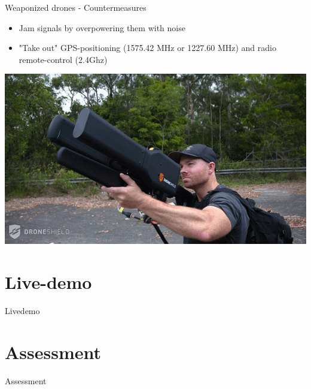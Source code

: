 \documentclass[aspectratio=169]{beamer}
\begin{document}
\begin{frame}{Weaponized drones - Countermeasures}
	\begin{itemize}
		\item Jam signals by overpowering them with noise
		\item "Take out" GPS-positioning (1575.42 MHz or 1227.60 MHz) and radio remote-control (2.4Ghz)
	\end{itemize}

\centering
\includegraphics[width=.6\textwidth]{images/drone_jammer.jpg}

\tiny{\color{gray}{http://www.dailymail.co.uk/sciencetech/article-3978762/The-death-ray-knock-drones-mile-away-Rifle-uses-radio-waves-kill-UAVs.html}}
\end{frame}

\section{Live-demo}
\begin{frame}{Livedemo}
\end{frame}

\section{Assessment}
\begin{frame}{Assessment}
\end{frame}
\end{document}
